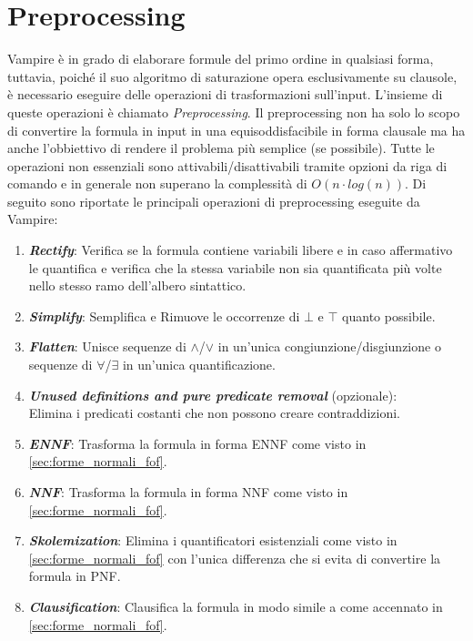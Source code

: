 \documentclass[./main.tex]{subfiles}
\begin{document}
\section{Preprocessing} \label{sec:vampire_preprocessing}
Vampire è in grado di elaborare formule del primo ordine in qualsiasi forma, 
tuttavia, poiché il suo algoritmo di saturazione opera esclusivamente su clausole,
è necessario eseguire delle operazioni di trasformazioni sull'input.
L'insieme di queste operazioni è chiamato \textit{Preprocessing}.
Il preprocessing non ha solo lo scopo di convertire la formula in input in una 
equisoddisfacibile in forma clausale ma ha anche l'obbiettivo di rendere il problema più
semplice (se possibile).
Tutte le operazioni non essenziali sono attivabili/disattivabili tramite
opzioni da riga di comando e in generale non superano la complessità di $O(n \cdot log(n))$.
Di seguito sono riportate le principali operazioni di preprocessing eseguite da Vampire:

\begin{enumerate}
    \item \textbf{\textit{Rectify}}:
    Verifica se la formula contiene variabili libere e in caso affermativo le quantifica
    e verifica che la stessa variabile non sia quantificata più volte nello stesso ramo dell'albero sintattico.
    \item \textbf{\textit{Simplify}}:
    Semplifica e Rimuove le occorrenze di $\bot$ e $\top$ quanto possibile.
    \item \textbf{\textit{Flatten}}:
    Unisce sequenze di $\land$/$\lor$ in un'unica congiunzione/disgiunzione o 
    sequenze di $\forall$/$\exists$ in un'unica quantificazione.
    \item \textbf{\textit{Unused definitions and pure predicate removal}} (opzionale): \\
    Elimina i predicati costanti che non possono creare contraddizioni.
    \item \textbf{\textit{ENNF}}:
    Trasforma la formula in forma ENNF come visto in \ref{sec:forme_normali_fof}.
    \item \textbf{\textit{NNF}}:
    Trasforma la formula in forma NNF come visto in \ref{sec:forme_normali_fof}.
    \item \textbf{\textit{Skolemization}}:
    Elimina i quantificatori esistenziali come visto in \ref{sec:forme_normali_fof} con l'unica 
    differenza che si evita di convertire la formula in PNF.
    \item \textbf{\textit{Clausification}}:
    Clausifica la formula in modo simile a come accennato in \ref{sec:forme_normali_fof}.
\end{enumerate}
\end{document}
